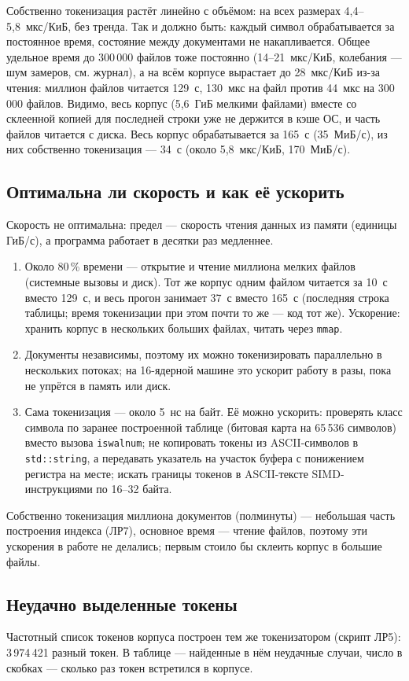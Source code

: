 Собственно токенизация растёт линейно с объёмом: на всех размерах 4,4--5,8~мкс/КиБ, без тренда. Так и должно быть: каждый символ обрабатывается за постоянное время, состояние между документами не накапливается. Общее удельное время до 300\,000 файлов тоже постоянно (14--21~мкс/КиБ, колебания --- шум замеров, см. журнал), а на всём корпусе вырастает до 28~мкс/КиБ из-за чтения: миллион файлов читается 129~с, 130~мкс на файл против 44~мкс на 300\,000 файлов. Видимо, весь корпус (5,6~ГиБ мелкими файлами) вместе со склеенной копией для последней строки уже не держится в кэше ОС, и часть файлов читается с диска. Весь корпус обрабатывается за 165~с (35~МиБ/с), из них собственно токенизация --- 34~с (около 5,8~мкс/КиБ, 170~МиБ/с).

\subsection{Оптимальна ли скорость и как её ускорить}
Скорость не оптимальна: предел --- скорость чтения данных из памяти (единицы ГиБ/с), а программа работает в десятки раз медленнее.
\begin{enumerate}
    \item Около 80\,\% времени --- открытие и чтение миллиона мелких файлов (системные вызовы и диск). Тот же корпус одним файлом читается за 10~с вместо 129~с, и весь прогон занимает 37~с вместо 165~с (последняя строка таблицы; время токенизации при этом почти то же --- код тот же). Ускорение: хранить корпус в нескольких больших файлах, читать через \texttt{mmap}.
    \item Документы независимы, поэтому их можно токенизировать параллельно в нескольких потоках; на 16-ядерной машине это ускорит работу в разы, пока не упрётся в память или диск.
    \item Сама токенизация --- около 5~нс на байт. Её можно ускорить: проверять класс символа по заранее построенной таблице (битовая карта на 65\,536 символов) вместо вызова \texttt{iswalnum}; не копировать токены из ASCII-символов в \texttt{std::string}, а передавать указатель на участок буфера с понижением регистра на месте; искать границы токенов в ASCII-тексте SIMD-инструкциями по 16--32 байта.
\end{enumerate}
Собственно токенизация миллиона документов (полминуты) --- небольшая часть построения индекса (ЛР7), основное время --- чтение файлов, поэтому эти ускорения в работе не делались; первым стоило бы склеить корпус в большие файлы.

\subsection{Неудачно выделенные токены}
Частотный список токенов корпуса построен тем же токенизатором (скрипт ЛР5): 3\,974\,421 разный токен. В таблице --- найденные в нём неудачные случаи, число в скобках --- сколько раз токен встретился в корпусе.

